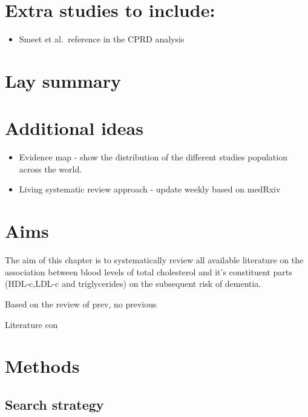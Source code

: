 \documentclass[a4paper, twoside]{templates/ociamthesis}
\providecommand{\tightlist}{%
  \setlength{\itemsep}{0pt}\setlength{\parskip}{0pt}}
\begin{document}
\hypertarget{extra-studies-to-include}{%
\section{Extra studies to include:}\label{extra-studies-to-include}}

\begin{itemize}
\tightlist
\item
  Smeet et al.~reference in the CPRD analysis
\end{itemize}

\hypertarget{lay-summary-1}{%
\section{Lay summary}\label{lay-summary-1}}

\hypertarget{additional-ideas-1}{%
\section{Additional ideas}\label{additional-ideas-1}}

\begin{itemize}
\tightlist
\item
  Evidence map - show the distribution of the different studies population across the world.
\item
  Living systematic review approach - update weekly based on medRxiv
\end{itemize}

\hypertarget{aims}{%
\section{Aims}\label{aims}}

The aim of this chapter is to systematically review all available literature on the association between blood levels of total cholesterol and it's constituent parts (HDL-c,LDL-c and triglycerides) on the subsequent risk of dementia.

Based on the review of prev, no previous

Literature con

\hypertarget{methods}{%
\section{Methods}\label{methods}}

\hypertarget{search-strategy}{%
\subsection{Search strategy}\label{search-strategy}}
\end{document}
